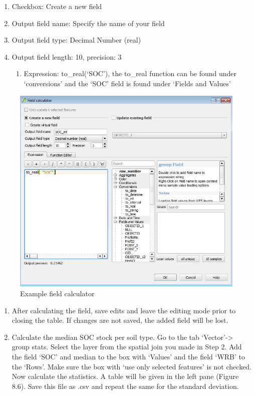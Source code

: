 \documentclass[10pt,b5paper,]{book}
\providecommand{\tightlist}{%
  \setlength{\itemsep}{0pt}\setlength{\parskip}{0pt}}
\theoremstyle{definition}
\theoremstyle{definition}
\theoremstyle{definition}
\theoremstyle{remark}
\begin{document}
\begin{enumerate}
\def\labelenumi{\alph{enumi}.}
\tightlist
\item
  Checkbox: Create a new field
\item
  Output field name: Specify the name of your field
\item
  Output field type: Decimal Number (real)
\item
  Output field length: 10, precision: 3

  \begin{enumerate}
  \def\labelenumii{\roman{enumii}.}
  \tightlist
  \item
    Expression: to\_real(`SOC'), the to\_real function can be found
    under `conversions' and the `SOC' field is found under `Fields and
    Values'
  \end{enumerate}
\end{enumerate}

\begin{figure}

{\centering \includegraphics[width=0.8\linewidth]{images/Conv_upscaling5} 

}

\caption{Example field calculator}\label{fig:unnamed-chunk-27}
\end{figure}

\begin{enumerate}
\def\labelenumi{\arabic{enumi}.}
\setcounter{enumi}{4}
\tightlist
\item
  After calculating the field, save edits and leave the editing mode
  prior to closing the table. If changes are not saved, the added field
  will be lost.
\item
  Calculate the median SOC stock per soil type. Go to the tab
  `Vector'-\textgreater{} group stats. Select the layer from the spatial
  join you made in Step 2. Add the field `SOC' and median to the box
  with `Values' and the field `WRB' to the `Rows'. Make sure the box
  with `use only selected features' is not checked. Now calculate the
  statistics. A table will be given in the left pane (Figure 8.6). Save
  this file as .csv and repeat the same for the standard deviation.
\end{enumerate}
\end{document}
